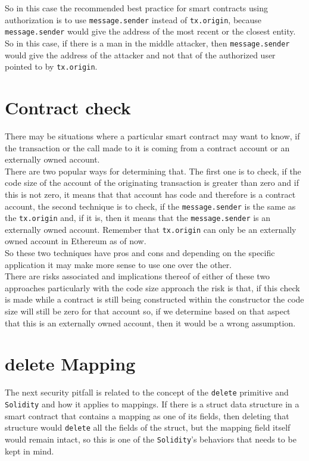 So in this case the recommended best practice for smart contracts using authorization is to use \texttt{message.sender} instead of \texttt{tx.origin}, because \texttt{message.sender} would give the address of the most recent or the closest entity. So in this case, if there is a man in the middle attacker, then \texttt{message.sender} would give the address of the attacker and not that of the authorized user pointed to by \texttt{tx.origin}.

\section{Contract check}

There may be situations where a particular smart contract may want to know, if the transaction or the call made to it is coming from a contract account or an externally owned account.\\

There are two popular ways for determining that. The first one is to check, if the code size of the account of the originating transaction is greater than zero and if this is not zero, it means that that account has code and therefore is a contract account, the second technique is to check, if the \texttt{message.sender} is the same as the \texttt{tx.origin} and, if it is, then it means that the \texttt{message.sender} is an externally owned account. Remember that \texttt{tx.origin} can only be an externally owned account in Ethereum as of now.\\

So these two techniques have pros and cons and depending on the specific application it may make more sense to use one over the other. \\

There are risks associated and implications thereof of either of these two approaches particularly with the code size approach the risk is that, if this check is made while a contract is still being constructed within the constructor the code size will still be zero for that account so, if we determine based on that aspect that this is an externally owned account, then it would be a wrong assumption.

\section{delete Mapping}

The next security pitfall is related to the concept of the \texttt{delete} primitive and \texttt{Solidity} and how it applies to mappings. If there is a struct data structure in a smart contract that contains a mapping as one of its fields, then deleting that structure would \texttt{delete} all the fields of the struct, but the mapping field itself would remain intact, so this is one of the \texttt{Solidity}'s behaviors that needs to be kept in mind.\\

